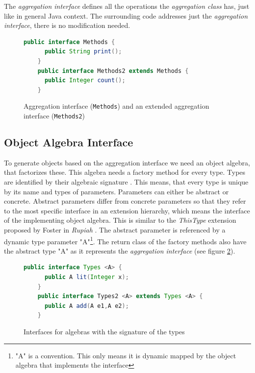 \documentclass{report}
\begin{document}
The \emph{aggregation interface} defines all the operations the \emph{aggregation class} has, just like in general Java context. The surrounding code addresses just the \emph{aggregation interface}, there is no modification needed.

\begin{figure}[h]
\begin{lstlisting}[language=java]
    public interface Methods {
      public String print();
    }
    public interface Methods2 extends Methods {
      public Integer count();
    }
\end{lstlisting}
\caption{Aggregation interface (\lstinline{Methods}) and an extended aggregation interface (\lstinline{Methods2})}
\label{aggregationInterfaces}
\end{figure}

\subsection{Object Algebra Interface}

To generate objects based on the aggregation interface we need an object algebra, that factorizes these. This algebra needs a factory method for every type. Types are identified by their algebraic signature \cite{Oliv-Extensibility-2012}. This means, that every type is unique by its name and types of parameters. Parameters can either be abstract or concrete. Abstract parameters differ from concrete parameters so that they refer to the most specific interface in an extension hierarchy, which means the interface of the implementing object algebra. This is similar to the \emph{ThisType} extension proposed by Foster in \emph{Rupiah} \cite{Foster-Rupiah-2001}. The abstract parameter is referenced by a dynamic type parameter "A"\footnote{"A" is a convention. This only means it is dynamic mapped by the object algebra that implements the interface}. The return class of the factory methods also have the abstract type "A" as it represents the \emph{aggregation interface} (see figure \ref{algebraInterfaces}).

\begin{figure}[h]
\begin{lstlisting}[language=java]
    public interface Types <A> {
      public A lit(Integer x);
    }
    public interface Types2 <A> extends Types <A> {
      public A add(A e1,A e2);
    }
\end{lstlisting}
\caption{Interfaces for algebras with the signature of the types}
\label{algebraInterfaces}
\end{figure}
\end{document}

